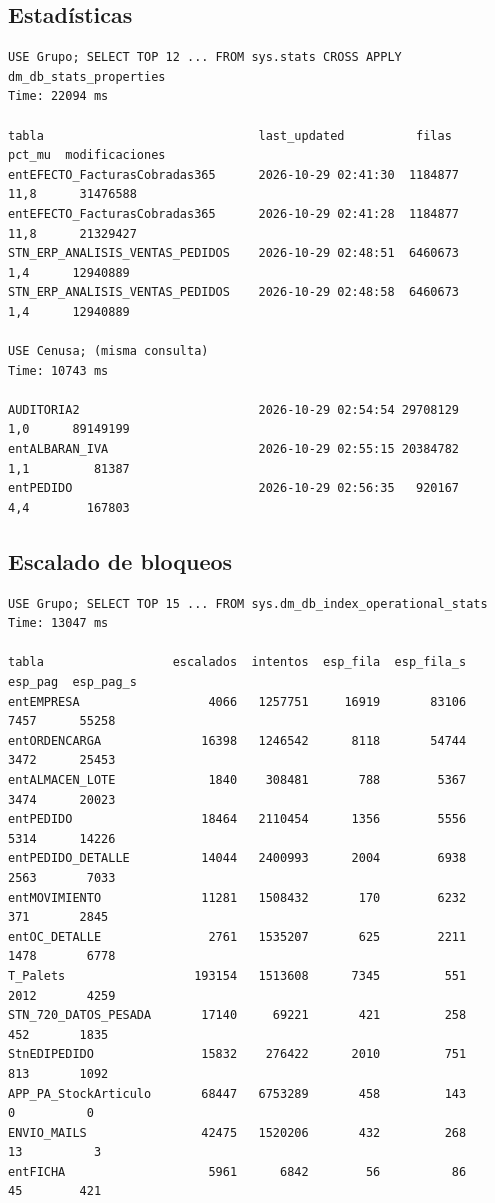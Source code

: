 \documentclass[11pt,a4paper]{article}
\begin{document}
\subsection{Estadísticas}

\begin{lstlisting}[style=salida]
USE Grupo; SELECT TOP 12 ... FROM sys.stats CROSS APPLY dm_db_stats_properties
Time: 22094 ms

tabla                              last_updated          filas    pct_mu  modificaciones
entEFECTO_FacturasCobradas365      2026-10-29 02:41:30  1184877    11,8      31476588
entEFECTO_FacturasCobradas365      2026-10-29 02:41:28  1184877    11,8      21329427
STN_ERP_ANALISIS_VENTAS_PEDIDOS    2026-10-29 02:48:51  6460673     1,4      12940889
STN_ERP_ANALISIS_VENTAS_PEDIDOS    2026-10-29 02:48:58  6460673     1,4      12940889

USE Cenusa; (misma consulta)
Time: 10743 ms

AUDITORIA2                         2026-10-29 02:54:54 29708129     1,0      89149199
entALBARAN_IVA                     2026-10-29 02:55:15 20384782     1,1         81387
entPEDIDO                          2026-10-29 02:56:35   920167     4,4        167803
\end{lstlisting}

\subsection{Escalado de bloqueos}

\begin{lstlisting}[style=salida]
USE Grupo; SELECT TOP 15 ... FROM sys.dm_db_index_operational_stats
Time: 13047 ms

tabla                  escalados  intentos  esp_fila  esp_fila_s  esp_pag  esp_pag_s
entEMPRESA                  4066   1257751     16919       83106     7457      55258
entORDENCARGA              16398   1246542      8118       54744     3472      25453
entALMACEN_LOTE             1840    308481       788        5367     3474      20023
entPEDIDO                  18464   2110454      1356        5556     5314      14226
entPEDIDO_DETALLE          14044   2400993      2004        6938     2563       7033
entMOVIMIENTO              11281   1508432       170        6232      371       2845
entOC_DETALLE               2761   1535207       625        2211     1478       6778
T_Palets                  193154   1513608      7345         551     2012       4259
STN_720_DATOS_PESADA       17140     69221       421         258      452       1835
StnEDIPEDIDO               15832    276422      2010         751      813       1092
APP_PA_StockArticulo       68447   6753289       458         143        0          0
ENVIO_MAILS                42475   1520206       432         268       13          3
entFICHA                    5961      6842        56          86       45        421
\end{lstlisting}
\end{document}
